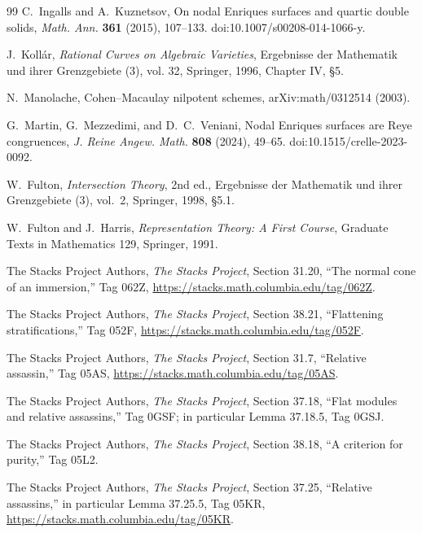 \begin{thebibliography}{99}
C.~Ingalls and A.~Kuznetsov,
On nodal Enriques surfaces and quartic double solids,
\emph{Math. Ann.} \textbf{361} (2015), 107--133.
doi:10.1007/s00208-014-1066-y.

J.~Koll\'ar,
\emph{Rational Curves on Algebraic Varieties},
Ergebnisse der Mathematik und ihrer Grenzgebiete (3), vol. 32,
Springer, 1996, Chapter IV, \S5.

N.~Manolache,
Cohen--Macaulay nilpotent schemes,
arXiv:math/0312514 (2003).

G.~Martin, G.~Mezzedimi, and D.~C.~Veniani,
Nodal Enriques surfaces are Reye congruences,
\emph{J. Reine Angew. Math.} \textbf{808} (2024), 49--65.
doi:10.1515/crelle-2023-0092.


W.~Fulton,
\emph{Intersection Theory}, 2nd ed.,
Ergebnisse der Mathematik und ihrer Grenzgebiete (3), vol.~2,
Springer, 1998, \S5.1.

W.~Fulton and J.~Harris,
\emph{Representation Theory: A First Course},
Graduate Texts in Mathematics 129, Springer, 1991.

The Stacks Project Authors,
\emph{The Stacks Project}, Section 31.20,
``The normal cone of an immersion,'' Tag 062Z,
\url{https://stacks.math.columbia.edu/tag/062Z}.

The Stacks Project Authors,
\emph{The Stacks Project}, Section 38.21,
``Flattening stratifications,'' Tag 052F,
\url{https://stacks.math.columbia.edu/tag/052F}.

The Stacks Project Authors,
\emph{The Stacks Project}, Section 31.7,
``Relative assassin,'' Tag 05AS,
\url{https://stacks.math.columbia.edu/tag/05AS}.

The Stacks Project Authors,
\emph{The Stacks Project}, Section 37.18,
``Flat modules and relative assassins,'' Tag 0GSF;
in particular Lemma 37.18.5, Tag 0GSJ.

The Stacks Project Authors,
\emph{The Stacks Project}, Section 38.18,
``A criterion for purity,'' Tag 05L2.

The Stacks Project Authors,
\emph{The Stacks Project}, Section 37.25,
``Relative assassins,'' in particular Lemma 37.25.5, Tag 05KR,
\url{https://stacks.math.columbia.edu/tag/05KR}.
\end{thebibliography}
